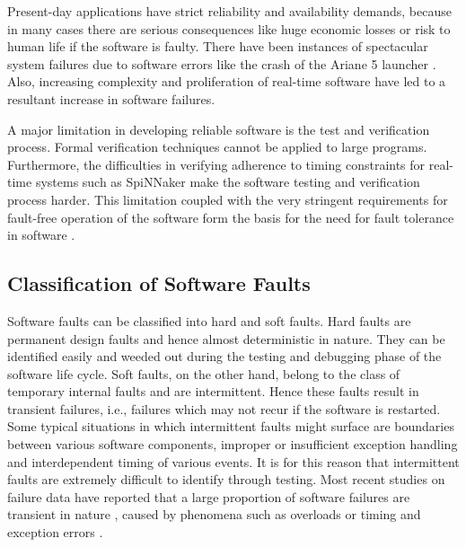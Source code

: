 \documentclass[a4paper, 11pt]{article}
\begin{document}
Present-day applications have strict reliability and availability demands, because in many cases there are serious consequences like huge economic losses or risk to human life if the software is faulty. There have been instances of spectacular system failures due to software errors like the crash of the Ariane 5 launcher \citep{lions1996ariane}. Also, increasing complexity and proliferation of real-time software have led to a resultant increase in software failures.

A major limitation in developing reliable software is the test and verification process. Formal verification techniques cannot be applied to large programs. Furthermore, the difficulties in verifying adherence to timing constraints for real-time systems such as SpiNNaker make the software testing and verification process harder. This limitation coupled with the very stringent requirements for fault-free operation of the software form the basis for the need for fault tolerance in software \citep{trivedi2008software}.

\subsection{Classification of Software Faults}

Software faults can be classified into hard and soft faults. Hard faults are permanent design faults and hence almost deterministic in nature. They can be identified easily and weeded out during the testing and debugging phase of the software life cycle. Soft faults, on the other hand, belong to the class of temporary internal faults and are intermittent. Hence these faults result in transient failures, i.e., failures which may not recur if the software is restarted. Some typical situations in which intermittent faults might surface are boundaries between various software components, improper or insufficient exception handling and interdependent timing of various events. It is for this reason that intermittent faults are extremely difficult to identify through testing. Most recent studies on failure data have reported that a large proportion of software failures are transient in nature \citep{gray1990census}, caused by phenomena such as overloads or timing and exception errors \citep{chillarege1995measurement}.
\end{document}
